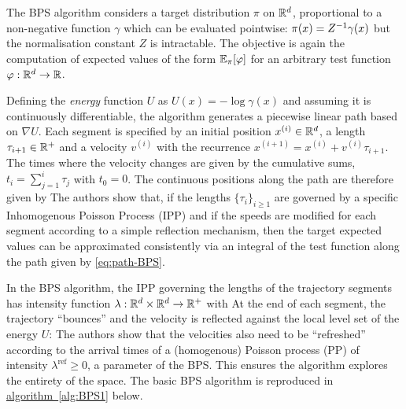 The BPS algorithm considers a target distribution $\pi$ on $\mathbb R^{d}$, proportional to a non-negative function $\gamma$ which can be evaluated pointwise: $\pi(x) = Z^{-1} \gamma(x)$
but the normalisation constant $Z$ is intractable. 
The objective is again the computation of expected values of the form $\mathbb E_\pi[\varphi]$ for an arbitrary test function $\varphi:\mathbb R^{d}\to \mathbb R$. 

Defining the \emph{energy} function $U$ as $U(x) = -\log \gamma(x)	$
 and assuming it is continuously differentiable, the algorithm generates a piecewise linear path based on $\nabla U$. 
 Each segment is specified by an initial position $x^{(i)}\in \mathbb R^{d}$, a length $\tau_{i+1}\in \mathbb R^{+}$ and a velocity $v^{(i)}$ with the recurrence $x^{(i+1)}=x^{(i)}+v^{(i)}\tau_{i+1}$. The times where the velocity changes are given by the cumulative sums, $t_i=\sum_{j=1}^{i}\tau_j$ with $t_0=0$. The continuous positions along the path are therefore given by
\eqa{	x(t) &=& x^{(i)} + v^{(i)}(t-t_i), \quad\text{for}\quad t\in[t_i,t_{i+1}).	\label{eq:path-BPS}}
The authors show that, if the lengths $\{\tau_{i}\}_{i\ge 1}$ are governed by a specific Inhomogenous Poisson Process (IPP) and if the speeds are modified for each segment according to a simple reflection mechanism, then the target expected values can be approximated consistently via an integral of the test function along the path given by \eqref{eq:path-BPS}.

In the BPS algorithm, the IPP governing the lengths of the trajectory segments has intensity function $\lambda:\mathbb R^{d}\times\mathbb R^{d}\to\mathbb R^{+}$ with
%
%
At the end of each segment, the trajectory ``bounces'' and the velocity is reflected against the local level set of the energy $U$:
The authors show that the velocities also need to be ``refreshed'' according to the arrival times of a (homogenous) Poisson process (PP) of intensity $\lambda^{\text{ref}}\ge 0$, a parameter of the BPS. This ensures the algorithm explores the entirety of the space. The basic BPS algorithm is reproduced in \hyperref[alg:BPS1]{algorithm~\ref*{alg:BPS1}} below.

\clearpage

